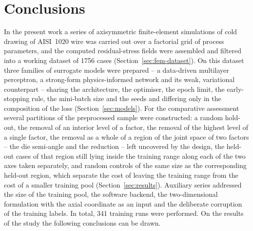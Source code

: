 \documentclass[pdflatex,sn-basic,Numbered]{sn-jnl}
\begin{document}
\section{Conclusions}
\label{sec:conclusions}

In the present work a series of axisymmetric finite-element simulations of cold drawing of AISI~1020 wire was carried out over a factorial grid of process parameters, and the computed residual-stress fields were assembled and filtered into a working dataset of 1756 cases (Section~\ref{sec:fem-dataset}). On this dataset three families of surrogate models were prepared -- a data-driven multilayer perceptron, a strong-form physics-informed network and its weak, variational counterpart -- sharing the architecture, the optimiser, the epoch limit, the early-stopping rule, the mini-batch size and the seeds and differing only in the composition of the loss (Section~\ref{sec:models}). For the comparative assessment several partitions of the preprocessed sample were constructed: a random hold-out, the removal of an interior level of a factor, the removal of the highest level of a single factor, the removal as a whole of a region of the joint space of two factors -- the die semi-angle and the reduction -- left uncovered by the design, the held-out cases of that region still lying inside the training range along each of the two axes taken separately, and random controls of the same size as the corresponding held-out region, which separate the cost of leaving the training range from the cost of a smaller training pool (Section~\ref{sec:results}). Auxiliary series addressed the size of the training pool, the software backend, the two-dimensional formulation with the axial coordinate as an input and the deliberate corruption of the training labels. In total, 341 training runs were performed. On the results of the study the following conclusions can be drawn.
\end{document}
